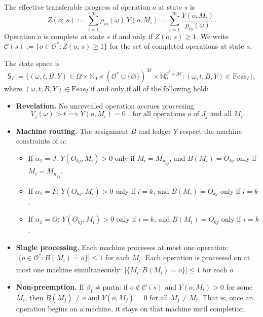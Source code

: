 The effective transferable progress of operation $o$ at state $s$ is
\[
Z(o;\, s) := \sum_{i=1}^{m} \rho_{io}(\omega)\, Y(o, M_i) = \sum_{i=1}^{m}
\frac{Y(o, M_i)}{p_{io}(\omega)}.
\]
Operation $o$ is complete at state $s$ if and only if $Z(o;\, s) \ge 1$. We write
$\mathcal{C}(s) := \{o \in \mathcal{O}^* : Z(o;\, s) \ge 1\}$ for the set of completed
operations at state $s$.

The state space is
\[
\mathsf{S}_I := \{(\omega, t, B, Y) \in \Omega \times \mathbb{N}_0 \times
(\mathcal{O}^* \cup \{\varnothing\})^{\mathcal{M}} \times
\mathbb{N}_0^{\mathcal{O}^* \times \mathcal{M}} :
(\omega, t, B, Y) \in \mathrm{Feas}_I\},
\]
where $(\omega, t, B, Y) \in \mathrm{Feas}_I$ if and only if all of the following hold:

\begin{itemize}
    \item[\textbf{(F1)}] \textbf{Revelation.} No unrevealed operation accrues
    processing:
    \[
    V_j(\omega) > t \implies Y(o, M_i) = 0 \quad \text{for all operations } o \text{ of }
    J_j \text{ and all } M_i.
    \]

    \item[\textbf{(F2)}] \textbf{Machine routing.} The assignment $B$ and ledger $Y$
    respect the machine constraints of $\alpha$:
    \begin{itemize}
        \item If $\alpha_1 = J$: $Y(O_{kj}, M_i) > 0$ only if $M_i = M_{\mu_{kj}}$, and
        $B(M_i) = O_{kj}$ only if $M_i = M_{\mu_{kj}}$.
        \item If $\alpha_1 = F$: $Y(O_{kj}, M_i) > 0$ only if $i = k$, and
        $B(M_i) = O_{kj}$ only if $i = k$.
        \item If $\alpha_1 = O$: $Y(O_{kj}, M_i) > 0$ only if $i = k$, and
        $B(M_i) = O_{kj}$ only if $i = k$.
    \end{itemize}

    \item[\textbf{(F3)}] \textbf{Single processing.} Each machine processes at most one
    operation: $|\{o \in \mathcal{O}^* : B(M_i) = o\}| \le 1$ for each $M_i$. Each
    operation is processed on at most one machine simultaneously:
    $|\{M_i : B(M_i) = o\}| \le 1$ for each $o$.

    \item[\textbf{(F4)}] \textbf{Non-preemption.} If $\beta_1 \neq \mathrm{pmtn}$: if
    $o \notin \mathcal{C}(s)$ and $Y(o, M_i) > 0$ for some $M_i$, then
    $B(M_j) \neq o$ and $Y(o, M_j) = 0$ for all $M_j \neq M_i$. That is, once an
    operation begins on a machine, it stays on that machine until completion.


\end{itemize}
